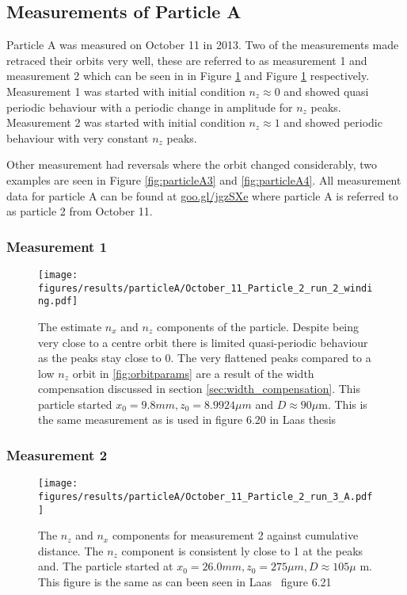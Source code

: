 \subsection{Measurements of Particle A}
Particle A was measured on October 11 in 2013. Two of the measurements made retraced their orbits very well, these are referred to as measurement 1 and measurement 2 which can be seen in  in Figure \ref{fig:particleA1} and Figure \ref{fig:particleA1} respectively. Measurement 1 was started with initial condition $n_z \approx 0$ and showed quasi periodic behaviour with a periodic change in amplitude for $n_z$ peaks. Measurement 2 was started with initial condition $n_z \approx 1$ and showed periodic behaviour with very constant $n_z$ peaks. 

Other measurement had reversals where the orbit changed considerably, two examples are seen in Figure \ref{fig:particleA3} and \ref{fig:particleA4}. All measurement data for particle A can be found at \url{goo.gl/jgzSXe} where particle A is referred to as particle 2 from October 11. 


\subsubsection{Measurement 1}
\begin{figure}[H]
\begin{center}
\texttt{[image: figures/results/particleA/October\_11\_Particle\_2\_run\_2\_winding.pdf]}
\end{center}
\caption{The estimate $n_x$ and $n_z$ components of the particle. Despite being very close to a centre orbit there is limited quasi-periodic behaviour as the peaks stay close to 0. The very flattened peaks compared to a low $n_z$ orbit in \ref{fig:orbitparams} are a result of the width compensation discussed in section \ref{sec:width_compensation}. This particle started $x_0 = 9.8 mm, z_0 = 8.9924 \mu m$ and $D \approx 90\mu$m. This is the same measurement as is used in figure 6.20 in Laas thesis~\cite{alexanderThesis}}
\label{fig:particleA1}
\end{figure}


\subsubsection{Measurement 2}
\begin{figure}[H]
\begin{center}
\texttt{[image: figures/results/particleA/October\_11\_Particle\_2\_run\_3\_A.pdf]}
\end{center}
\caption{The $n_z$ and $n_x$ components for measurement 2 against cumulative distance. The $n_z$ component is consistent ly close to 1 at the peaks and. The particle started at $ x_0 = 26.0 mm, z_0 = 275\mu m, D\approx 105\mu$ m. This figure is the same as can been seen in Laas~\cite{alexanderThesis} figure 6.21}
\label{fig:particleA2}
\end{figure}

